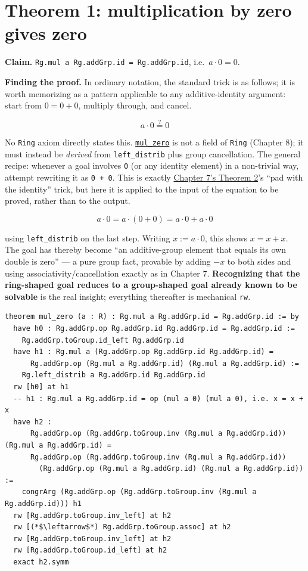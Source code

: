 \section{Theorem 1: multiplication by zero gives zero}\label{sec:09-ring-theorems:02-theorem-1:1}

\textbf{Claim.} \texttt{Rg.mul a Rg.addGrp.id = Rg.addGrp.id}, i.e.~\(a \cdot 0 = 0\).

\textbf{Finding the proof.} In ordinary notation, the standard trick is as follows; it is worth memorizing as a pattern applicable to any additive-identity argument: start from \(0 = 0 + 0\), multiply through, and cancel.

\[
a \cdot 0 \overset{?}{=} 0
\]

No \texttt{Ring} axiom directly states this. \href{https://loogle.lean-lang.org/?q=mul_zero}{\texttt{mul\_\allowbreak{}zero}} is not a field of \texttt{Ring} (Chapter 8); it must instead be \emph{derived} from \texttt{left\_\allowbreak{}distrib} plus group cancellation. The general recipe: whenever a goal involves \texttt{0} (or any identity element) in a non-trivial way, attempt rewriting it as \texttt{0 + 0}. This is exactly \hyperref[sec:07-group-theorems:03-theorem-2:1]{Chapter 7's Theorem 2}'s ``pad with the identity'' trick, but here it is applied to the input of the equation to be proved, rather than to the output.

\[
a \cdot 0 = a \cdot (0 + 0) = a\cdot 0 + a \cdot 0
\]

using \texttt{left\_\allowbreak{}distrib} on the last step. Writing \(x := a \cdot 0\), this shows \(x = x + x\). The goal has thereby become ``an additive-group element that equals its own double is zero'' --- a pure group fact, provable by adding \(-x\) to both sides and using associativity/cancellation exactly as in Chapter 7. \textbf{Recognizing that the ring-shaped goal reduces to a group-shaped goal already known to be solvable} is the real insight; everything thereafter is mechanical \texttt{rw}.

\begin{lstlisting}
theorem mul_zero (a : R) : Rg.mul a Rg.addGrp.id = Rg.addGrp.id := by
  have h0 : Rg.addGrp.op Rg.addGrp.id Rg.addGrp.id = Rg.addGrp.id :=
    Rg.addGrp.toGroup.id_left Rg.addGrp.id
  have h1 : Rg.mul a (Rg.addGrp.op Rg.addGrp.id Rg.addGrp.id) =
      Rg.addGrp.op (Rg.mul a Rg.addGrp.id) (Rg.mul a Rg.addGrp.id) :=
    Rg.left_distrib a Rg.addGrp.id Rg.addGrp.id
  rw [h0] at h1
  -- h1 : Rg.mul a Rg.addGrp.id = op (mul a 0) (mul a 0), i.e. x = x + x
  have h2 :
      Rg.addGrp.op (Rg.addGrp.toGroup.inv (Rg.mul a Rg.addGrp.id)) (Rg.mul a Rg.addGrp.id) =
      Rg.addGrp.op (Rg.addGrp.toGroup.inv (Rg.mul a Rg.addGrp.id))
        (Rg.addGrp.op (Rg.mul a Rg.addGrp.id) (Rg.mul a Rg.addGrp.id)) :=
    congrArg (Rg.addGrp.op (Rg.addGrp.toGroup.inv (Rg.mul a Rg.addGrp.id))) h1
  rw [Rg.addGrp.toGroup.inv_left] at h2
  rw [(*$\leftarrow$*) Rg.addGrp.toGroup.assoc] at h2
  rw [Rg.addGrp.toGroup.inv_left] at h2
  rw [Rg.addGrp.toGroup.id_left] at h2
  exact h2.symm
\end{lstlisting}

